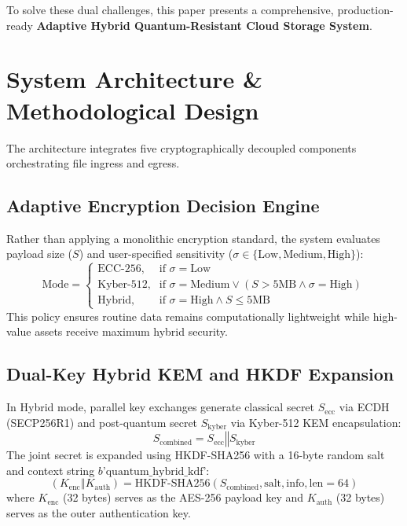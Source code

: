 \documentclass[journal,twoside]{IEEEtran}
\begin{document}
To solve these dual challenges, this paper presents a comprehensive, production-ready \textbf{Adaptive Hybrid Quantum-Resistant Cloud Storage System}.

\section{System Architecture \& Methodological Design}
The architecture integrates five cryptographically decoupled components orchestrating file ingress and egress.

\subsection{Adaptive Encryption Decision Engine}
Rather than applying a monolithic encryption standard, the system evaluates payload size ($S$) and user-specified sensitivity ($\sigma \in \{\text{Low}, \text{Medium}, \text{High}\}$):
\begin{equation}
\text{Mode} = \begin{cases} 
\text{ECC-256}, & \text{if } \sigma = \text{Low} \\
\text{Kyber-512}, & \text{if } \sigma = \text{Medium} \lor (S > 5\text{MB} \land \sigma = \text{High}) \\
\text{Hybrid}, & \text{if } \sigma = \text{High} \land S \le 5\text{MB}
\end{cases}
\end{equation}
This policy ensures routine data remains computationally lightweight while high-value assets receive maximum hybrid security.

\subsection{Dual-Key Hybrid KEM and HKDF Expansion}
In Hybrid mode, parallel key exchanges generate classical secret $S_{\text{ecc}}$ via ECDH (SECP256R1) and post-quantum secret $S_{\text{kyber}}$ via Kyber-512 KEM encapsulation:
\begin{equation}
S_{\text{combined}} = S_{\text{ecc}} \mathbin{\Vert} S_{\text{kyber}}
\end{equation}
The joint secret is expanded using HKDF-SHA256 with a 16-byte random salt and context string $b\text{'quantum\_hybrid\_kdf'}$:
\begin{equation}
(K_{\text{enc}} \mathbin{\Vert} K_{\text{auth}}) = \text{HKDF-SHA256}(S_{\text{combined}}, \text{salt}, \text{info}, \text{len}=64)
\end{equation}
where $K_{\text{enc}}$ (32 bytes) serves as the AES-256 payload key and $K_{\text{auth}}$ (32 bytes) serves as the outer authentication key.
\end{document}
